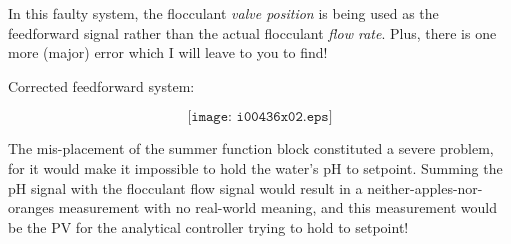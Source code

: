In this faulty system, the flocculant {\it valve position} is being used as the feedforward signal rather than the actual flocculant {\it flow rate}.  Plus, there is one more (major) error which I will leave to you to find!
 






Corrected feedforward system:

$$\texttt{[image: i00436x02.eps]}$$

The mis-placement of the summer function block constituted a severe problem, for it would make it impossible to hold the water's pH to setpoint.  Summing the pH signal with the flocculant flow signal would result in a neither-apples-nor-oranges measurement with no real-world meaning, and this measurement would be the PV for the analytical controller trying to hold to setpoint!




